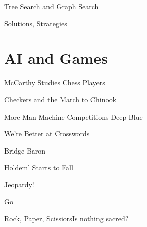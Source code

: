\documentclass{powerdot}
\begin{document}
\begin{slide}{Tree Search and Graph Search}
\end{slide}

\begin{slide}{Solutions, Strategies}
\end{slide}

\section{AI and Games}

\begin{slide}{McCarthy Studies Chess Players}
\end{slide}

\begin{slide}{Checkers and the March to Chinook}
\end{slide}

\begin{slide}{More Man Machine Competitions \hfill Deep Blue}
\end{slide}

\begin{slide}{We're Better at Crosswords}
\end{slide}

\begin{slide}{Bridge Baron}
\end{slide}

\begin{slide}{Holdem' Starts to Fall}
\end{slide}

\begin{slide}{Jeopardy!}
\end{slide}

\begin{slide}{Go}
\end{slide}

\begin{slide}{Rock, Paper, Scissiors\hfill Is nothing sacred?}
\end{slide}
\end{document}
